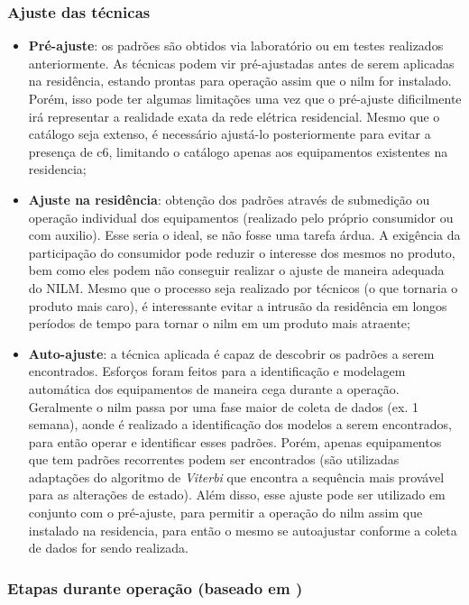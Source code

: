 \subsubsection{Ajuste das técnicas}
\label{top:ajuste_das_tecnicas}

\begin{itemize}
\item \textbf{Pré-ajuste}: os padrões são obtidos via laboratório ou
em testes realizados anteriormente. As técnicas podem vir
pré-ajustadas antes de serem aplicadas na residência, estando prontas
para operação assim que o \acs{nilm} for instalado. Porém, isso pode
ter algumas limitações uma vez que o pré-ajuste dificilmente irá
representar a realidade exata da rede elétrica residencial. Mesmo que
o catálogo seja extenso, é necessário ajustá-lo posteriormente para
evitar a presença de \acs{c6}, limitando o catálogo apenas aos
equipamentos existentes na residencia;
\item \textbf{Ajuste na residência}: obtenção dos padrões através de
submedição ou operação individual dos equipamentos (realizado pelo
próprio consumidor ou com auxilio). Esse seria o ideal, se não fosse
uma tarefa árdua. A exigência da participação do consumidor pode
reduzir o interesse dos mesmos no produto, bem como eles podem não
conseguir realizar o ajuste de maneira adequada do NILM.
Mesmo que o processo seja realizado por técnicos (o que tornaria o
produto mais caro), é interessante evitar a intrusão
da residência em longos períodos de tempo para tornar o \acs{nilm}
em um produto mais atraente;
\item \textbf{Auto-ajuste}: a técnica aplicada é capaz de descobrir os
padrões a serem encontrados. Esforços foram feitos para a
identificação e modelagem automática dos equipamentos de maneira cega
durante a operação. Geralmente o \acs{nilm} passa por uma fase maior de
coleta de dados (ex. 1 semana), aonde é realizado a identificação dos
modelos a serem encontrados, para então operar e identificar esses
padrões. Porém, apenas equipamentos que tem padrões recorrentes podem
ser encontrados (são utilizadas adaptações do algoritmo de
\emph{Viterbi} que encontra a sequência mais provável para as
alterações de estado). Além disso, esse ajuste pode ser utilizado em
conjunto com o pré-ajuste, para permitir a operação do \acs{nilm}
assim que instalado na residencia, para então o mesmo se autoajustar
conforme a coleta de dados for sendo realizada.
\end{itemize}

\subsubsection[Etapas durante operação]{Etapas durante operação 
(baseado em \cite{nilm_matthews_overview_2008_22})}
\label{top:etapas}

